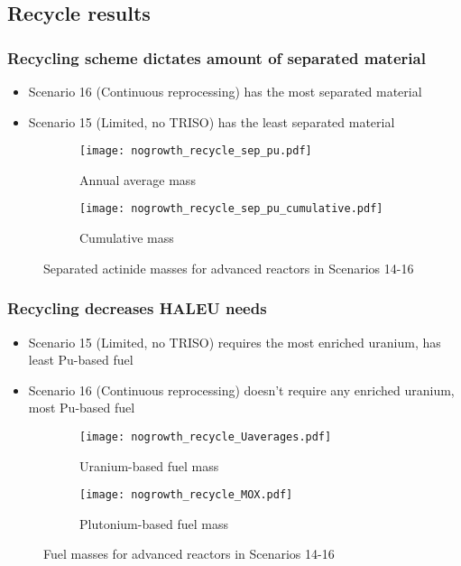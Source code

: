 \subsection{Recycle results}

\begin{frame}
    \frametitle{Recycling scheme dictates amount of separated material}
    \begin{itemize}
        \item Scenario 16 (Continuous reprocessing) has the 
              most separated material 
        \item Scenario 15 (Limited, no TRISO) has the least separated 
              material
    \end{itemize}
    \begin{figure}
        \centering
        \begin{subfigure}{0.48\textwidth}
            \texttt{[image: nogrowth\_recycle\_sep\_pu.pdf]}
            \caption{Annual average mass}
        \end{subfigure}
        \hfill
        \begin{subfigure}{0.48\textwidth}
            \texttt{[image: nogrowth\_recycle\_sep\_pu\_cumulative.pdf]}
            \caption{Cumulative mass}
        \end{subfigure}
        \caption{Separated actinide masses for advanced reactors in Scenarios 14-16}
        \label{fig:recycle_sep_pu}
    \end{figure}
\end{frame}

\begin{frame}
    \frametitle{Recycling decreases HALEU needs}
    \begin{itemize}
        \item Scenario 15 (Limited, no TRISO) requires the most 
              enriched uranium, has least Pu-based fuel
        \item Scenario 16 (Continuous reprocessing) doesn't 
              require any enriched uranium, most Pu-based fuel
    \end{itemize}
    \begin{figure}
        \centering
        \begin{subfigure}{0.48\textwidth}
            \texttt{[image: nogrowth\_recycle\_Uaverages.pdf]}
            \caption{Uranium-based fuel mass}
        \end{subfigure}
        \hfill
        \begin{subfigure}{0.48\textwidth}
            \texttt{[image: nogrowth\_recycle\_MOX.pdf]}
            \caption{Plutonium-based fuel mass}
        \end{subfigure}
        \caption{Fuel masses for advanced reactors in Scenarios 14-16}
        \label{fig:recycle_fuel}
    \end{figure}
\end{frame}

